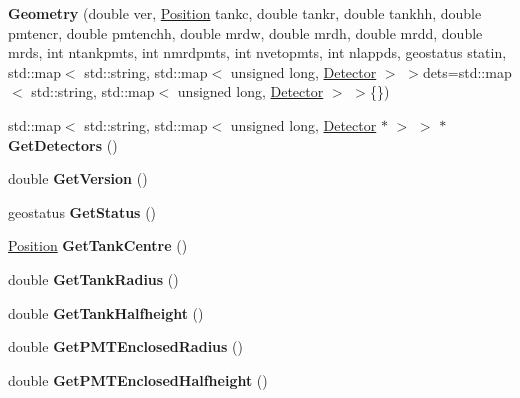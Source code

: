 \begin{DoxyCompactItemize}
\item 
\hypertarget{classGeometry_a4928428c8982ec5bbdde2cb3d03adc66}{
{\bfseries Geometry} (double ver, \hyperlink{classPosition}{Position} tankc, double tankr, double tankhh, double pmtencr, double pmtenchh, double mrdw, double mrdh, double mrdd, double mrds, int ntankpmts, int nmrdpmts, int nvetopmts, int nlappds, geostatus statin, std::map$<$ std::string, std::map$<$ unsigned long, \hyperlink{classDetector}{Detector} $>$ $>$dets=std::map$<$ std::string, std::map$<$ unsigned long, \hyperlink{classDetector}{Detector} $>$ $>$\{\})}
\label{classGeometry_a4928428c8982ec5bbdde2cb3d03adc66}

\item 
\hypertarget{classGeometry_a17853a4c230bfa8f8dc38d4982311f64}{
std::map$<$ std::string, std::map$<$ unsigned long, \hyperlink{classDetector}{Detector} $\ast$ $>$ $>$ $\ast$ {\bfseries GetDetectors} ()}
\label{classGeometry_a17853a4c230bfa8f8dc38d4982311f64}

\item 
\hypertarget{classGeometry_a94c52a826664f141dd3246fa1478a475}{
double {\bfseries GetVersion} ()}
\label{classGeometry_a94c52a826664f141dd3246fa1478a475}

\item 
\hypertarget{classGeometry_a21835bb3d23fd54895350c84471dfb02}{
geostatus {\bfseries GetStatus} ()}
\label{classGeometry_a21835bb3d23fd54895350c84471dfb02}

\item 
\hypertarget{classGeometry_a804b7ce9d8f1abe1ce5fffe9da65af51}{
\hyperlink{classPosition}{Position} {\bfseries GetTankCentre} ()}
\label{classGeometry_a804b7ce9d8f1abe1ce5fffe9da65af51}

\item 
\hypertarget{classGeometry_abc3f55a2c64ec9f83a0ea7e82724fe49}{
double {\bfseries GetTankRadius} ()}
\label{classGeometry_abc3f55a2c64ec9f83a0ea7e82724fe49}

\item 
\hypertarget{classGeometry_acc0459993448786f92dbdad8c4652176}{
double {\bfseries GetTankHalfheight} ()}
\label{classGeometry_acc0459993448786f92dbdad8c4652176}

\item 
\hypertarget{classGeometry_abd765c4d73ceba92e39d007b6c3362bd}{
double {\bfseries GetPMTEnclosedRadius} ()}
\label{classGeometry_abd765c4d73ceba92e39d007b6c3362bd}

\item 
\hypertarget{classGeometry_a42b716a80c24a5278099e7ae8515dd69}{
double {\bfseries GetPMTEnclosedHalfheight} ()}
\label{classGeometry_a42b716a80c24a5278099e7ae8515dd69}


\end{DoxyCompactItemize}
